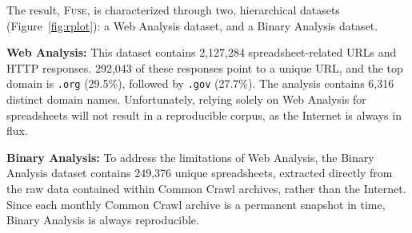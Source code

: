 \documentclass[conference]{IEEEtran}
\newcommand{\urlcount}{2,127,284}
\newcommand{\xlscount}{249,376}
\begin{document}

The result, \textsc{Fuse}, is characterized through two, hierarchical datasets (Figure~\ref{fig:rplot}): a Web Analysis dataset, and a Binary Analysis dataset.

\textbf{Web Analysis:} This dataset contains \urlcount{} spreadsheet-related URLs and HTTP responses. 292,043 of these responses point to a unique URL, and the top domain is \texttt{.org} (29.5\%), followed by \texttt{.gov} (27.7\%). The analysis contains 6,316 distinct domain names. Unfortunately, relying solely on Web Analysis for spreadsheets will not result in a reproducible corpus, as the Internet is always in flux.



\textbf{Binary Analysis:}  To address the limitations of Web Analysis, the Binary Analysis dataset contains \xlscount{} unique spreadsheets, extracted directly from the raw data contained within Common Crawl archives, rather than the Internet. Since each monthly Common Crawl archive is a permanent snapshot in time, Binary Analysis is always reproducible.
\end{document}
